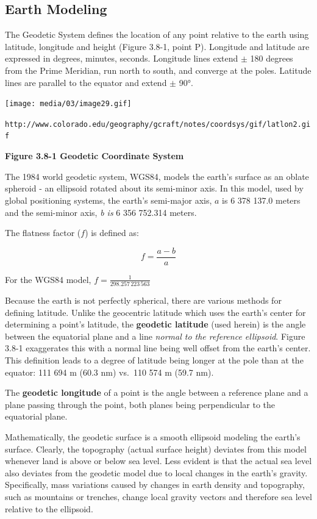 \documentclass[
]{book}
\begin{document}
\hypertarget{earth-modeling}{%
\subsection*{Earth Modeling}\label{earth-modeling}}

The Geodetic System defines the location of any point relative to the earth using latitude, longitude and height (Figure 3.8-1, point P). Longitude and latitude are expressed in degrees, minutes, seconds. Longitude lines extend \(\pm\) 180 degrees from the Prime Meridian, run north to south, and converge at the poles. Latitude lines are parallel to the equator and extend \(\pm\) 90°.

\texttt{[image: media/03/image29.gif]}

\texttt{http://www.colorado.edu/geography/gcraft/notes/coordsys/gif/latlon2.gif}

\textbf{Figure 3.8-1 Geodetic Coordinate System}

The 1984 world geodetic system, WGS84, models the earth's surface as an oblate spheroid - an ellipsoid rotated about its semi-minor axis. In this model, used by global positioning systems, the earth's semi-major axis, \(a\) is 6 378 137.0 meters and the semi-minor axis, \emph{b is} 6 356 752.314 meters.

The flatness factor (\(f\)) is defined as:

\[f = \frac{a - b}{a}\]

For the WGS84 model, \(f = \frac{1}{298.257\,223\,563}\)

Because the earth is not perfectly spherical, there are various methods for defining latitude. Unlike the geocentric latitude which uses the earth's center for determining a point's latitude, the \textbf{geodetic latitude} (used herein) is the angle between the equatorial plane and a line \emph{normal to the reference ellipsoid}. Figure 3.8-1 exaggerates this with a normal line being well offset from the earth's center. This definition leads to a degree of latitude being longer at the pole than at the equator: 111 694 m (60.3 nm) vs.~110 574 m (59.7 nm).

The \textbf{geodetic longitude} of a point is the angle between a reference plane and a plane passing through the point, both planes being perpendicular to the equatorial plane.

Mathematically, the geodetic surface is a smooth ellipsoid modeling the earth's surface. Clearly, the topography (actual surface height) deviates from this model whenever land is above or below sea level. Less evident is that the actual sea level also deviates from the geodetic model due to local changes in the earth's gravity. Specifically, mass variations caused by changes in earth density and topography, such as mountains or trenches, change local gravity vectors and therefore sea level relative to the ellipsoid.
\end{document}
